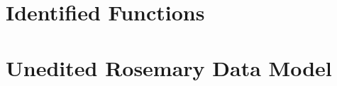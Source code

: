\documentclass[a4paper]{report}
\begin{document}
	
	
	\chapter{Identified Functions}
	\label{identified-functions}
	
	
	
	\chapter{Unedited Rosemary Data Model}
	\label{unedited-datamodel}
	
	
\end{document}
